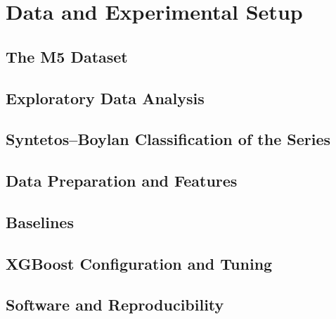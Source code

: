 \chapter{Data and Experimental Setup}
\label{ch:setup}

\section{The M5 Dataset}

\section{Exploratory Data Analysis}

\section{Syntetos--Boylan Classification of the Series}

\section{Data Preparation and Features}

\section{Baselines}

\section{XGBoost Configuration and Tuning}

\section{Software and Reproducibility}

